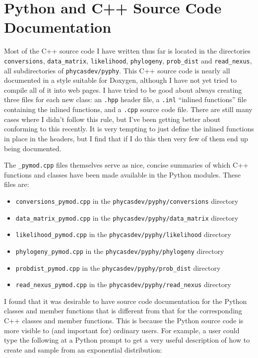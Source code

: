 \documentclass[10pt]{article}
\begin{document}
\section{Python and C++ Source Code Documentation}

Most of the C++ source code I have written thus far is located in the directories {\tt conversions}, {\tt data\_matrix}, {\tt likelihood}, {\tt phylogeny}, {\tt prob\_dist} and {\tt read\_nexus}, all subdirectories of {\tt phycasdev/pyphy}. This C++ source code is nearly all documented in a style suitable for Doxygen, although I have not yet tried to compile all of it into web pages. I have tried to be good about always creating three files for each new class: an {\tt .hpp} header file, a {\tt .inl} ``inlined functions'' file containing the inlined functions, and a {\tt .cpp} source code file. There are still many cases where I didn't follow this rule, but I've been getting better about conforming to this recently. It is very tempting to just define the inlined functions in place in the headers, but I find that if I do this then very few of them end up being documented.

The {\tt *\_pymod.cpp} files themselves serve as nice, concise summaries of which C++ functions and classes have been made available in the Python modules. These files are: 
\begin{itemize}
\item[] {\tt conversions\_pymod.cpp} in the {\tt phycasdev/pyphy/conversions} directory
\item[] {\tt data\_matrix\_pymod.cpp} in the {\tt phycasdev/pyphy/data\_matrix} directory
\item[] {\tt likelihood\_pymod.cpp} in the {\tt phycasdev/pyphy/likelihood} directory
\item[] {\tt phylogeny\_pymod.cpp} in the {\tt phycasdev/pyphy/phylogeny} directory
\item[] {\tt probdist\_pymod.cpp} in the {\tt phycasdev/pyphy/prob\_dist} directory
\item[] {\tt read\_nexus\_pymod.cpp} in the {\tt phycasdev/pyphy/read\_nexus} directory
\end{itemize}

I found that it was desirable to have source code documentation for the Python classes and member functions that is different from that for the corresponding C++ classes and member functions. This is because the Python source code is more visible to (and important for) ordinary users. For example, a user could type the following at a Python prompt to get a very useful description of how to create and sample from an exponential distribution:
\end{document}
